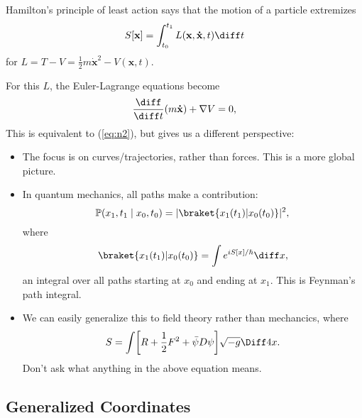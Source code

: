 \documentclass[12pt]{article}
\begin{document}
Hamilton's principle of least action says that the motion of a particle extremizes
\[
	S[\mathbf{x}] = \int_{t_0}^{t_1} L(\mathbf{x}, \mathbf{\dot x}, t) \diff t
\]
for $L = T - V = \frac{1}{2} m \mathbf{\dot x}^2 - V(\mathbf{x}, t)$.

For this $L$, the Euler-Lagrange equations become
\[
\frac{\diff}{\diff t}(m \mathbf{\dot x}) + \nabla V = 0,
\]
This is equivalent to (\ref{eq:n2}), but gives us a different perspective:
\begin{itemize}
	\item The focus is on curves/trajectories, rather than forces. This is a more global picture.
	\item In quantum mechanics, all paths make a contribution:
		\[
			\mathbb{P}(x_1, t_1 \mid x_0, t_0) = | \braket{x_1(t_1)|x_0(t_0)}|^2,
		\]
		where
		\[
			\braket{x_1(t_1)|x_0(t_0)} = \int e^{iS[x]/\hbar} \diff x,
		\]
		an integral over all paths starting at $x_0$ and ending at $x_1$. This is Feynman's path integral.
	\item We can easily generalize this to field theory rather than mechancics, where
		\[
			S = \int \biggl[ R + \frac{1}{2} F^2 + \bar \psi D \psi \biggr] \sqrt{-g} \Diff4 x.
		\]
		Don't ask what anything in the above equation means.
\end{itemize}


\subsection{Generalized Coordinates}
\label{sub:gen_coords}
\end{document}
